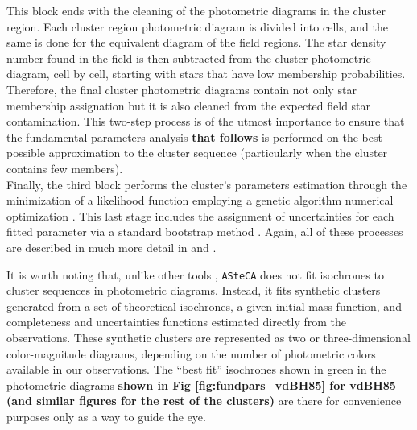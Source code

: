 \documentclass[referee]{aa}
\begin{document}
This block ends with the cleaning of the photometric diagrams in the cluster
region. Each cluster region photometric diagram is divided into cells, and
the same is done for the equivalent diagram of the field regions. The star
density number found in the field is then subtracted from the cluster
photometric diagram, cell by cell, starting with stars that have low
membership probabilities. Therefore, the final cluster photometric diagrams
contain not only star membership assignation but it is also cleaned from the
expected field star contamination. This two-step process is of the utmost
importance to ensure that the fundamental parameters analysis \textbf{that
follows} is performed on the best possible approximation to the cluster
sequence (particularly when the cluster contains few members).\\

Finally, the third block performs the cluster's parameters estimation through
the minimization of a likelihood function \citep{Dolphin_2002} employing a
genetic algorithm numerical optimization \citep{Charbonneau_1995}. This last
stage includes the assignment of uncertainties for each fitted parameter via a
standard bootstrap method \citep{efron1986}. Again, all of these processes are
described in much more detail in \cite{Perren_2015} and \cite{Perren_2017}.

It is worth noting that, unlike other tools \citep[e.g.:][]{Yen_2018},
\texttt{ASteCA} does not fit isochrones to cluster sequences in photometric
diagrams. Instead, it fits synthetic clusters generated from a set of
theoretical isochrones, a given initial mass function, and completeness and
uncertainties functions estimated directly from the observations.
These synthetic clusters are represented as two or three-dimensional
color-magnitude diagrams, depending on the number of photometric colors
available in our observations. The ``best fit'' isochrones shown in green in
the photometric diagrams \textbf{shown in Fig 
\ref{fig:fundpars_vdBH85} for vdBH85 (and similar figures for the rest of the
clusters)} are there for convenience purposes only as a way to guide the eye.
\end{document}
